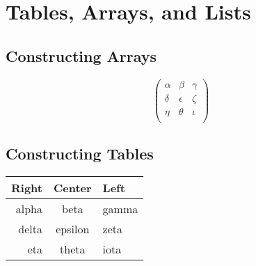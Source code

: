 \documentclass{article}
\begin{document}
\section{Tables, Arrays, and Lists}
\subsection{Constructing Arrays}

$$
\left(
\begin{array}{rcl}
\alpha & \beta & \gamma \\
\delta & \epsilon & \zeta \\
\eta & \theta & \iota \\
\end{array}
\right)
$$

\subsection{Constructing Tables}
\begin{tabular}{|r|c|l|}
\hline
Right & Center & Left \\
\hline
alpha & beta & gamma \\
delta & epsilon & zeta \\
eta & theta & iota \\
\hline
\end{tabular}
\end{document}
